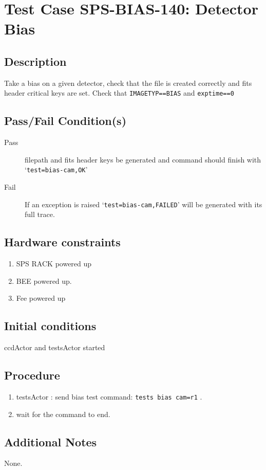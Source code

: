 \section{Test Case SPS-BIAS-140: Detector Bias}

\subsection{Description}

Take a bias on a given detector, check that the file is created correctly and fits header critical keys are set.
Check that \texttt{IMAGETYP==BIAS} and \texttt{exptime==0}


\subsection{Pass/Fail Condition(s)}

\begin{description}
\item [Pass] filepath and fits header keys be generated and command should finish with `\texttt{test=bias-cam,OK}'
\item [Fail] If an exception is raised `\texttt{test=bias-cam,FAILED}' will be generated with its full trace.

\end{description}

\subsection{Hardware constraints}

\begin{enumerate}
    \item SPS RACK powered up
    \item BEE powered up.
    \item Fee powered up
\end{enumerate}

\subsection{Initial conditions}

ccdActor and testsActor started

\subsection{Procedure}

\begin{enumerate}
    \item testsActor : send bias test command: \texttt{tests bias cam=r1} .
    \item wait for the command to end.
\end{enumerate}

\subsection{Additional Notes}
None.
